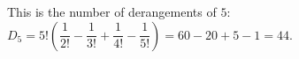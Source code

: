 This is the number of derangements of $5$: $D_5=5!\left(\dfrac{1}{2!}-\dfrac{1}{3!}+\dfrac{1}{4!}-\dfrac{1}{5!}\right)=60-20+5-1=\boxed{44}$.
